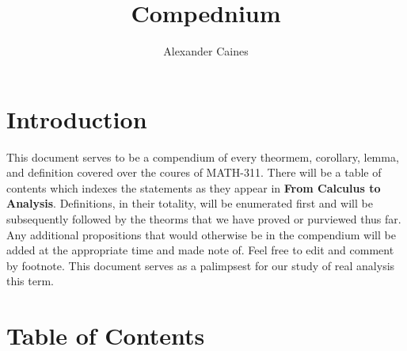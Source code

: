 \documentclass[11pt]{article}
\title{{\bf Compednium}}
\author{Alexander Caines}
\date{}
\begin{document}
\maketitle

\section{Introduction}
This document serves to be a compendium of every theormem, corollary, lemma,
and definition covered over the coures of MATH-311. There will be a table of
contents which indexes the statements as they appear in \textbf{From Calculus to Analysis}.
Definitions, in their totality, will be enumerated first and will be subsequently followed by 
the theorms that we have proved or purviewed thus far.
Any additional propositions that would otherwise be in the compendium will be 
added at the appropriate time and made note of. Feel free to edit and comment by footnote.
This document serves as a palimpsest for our study of real analysis this term.

\section{Table of Contents}
\end{document}
